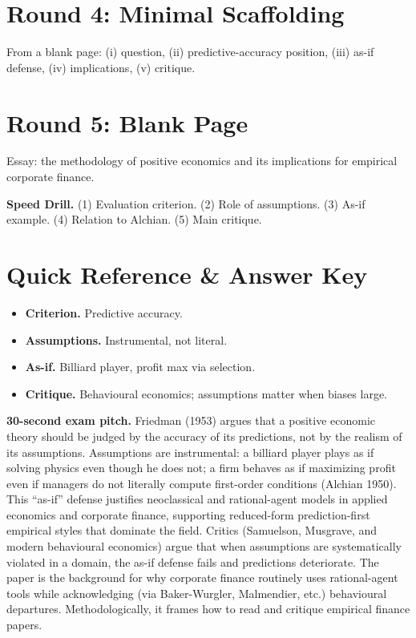 \documentclass[11pt]{article}
\begin{document}
\section*{Round 4: Minimal Scaffolding}
From a blank page: (i) question, (ii) predictive-accuracy position, (iii) as-if defense, (iv) implications, (v) critique.

\section*{Round 5: Blank Page}
Essay: the methodology of positive economics and its implications for empirical corporate finance.

\vspace{6pt}
\begin{drillbox}
\textbf{Speed Drill.} (1) Evaluation criterion. (2) Role of assumptions. (3) As-if example. (4) Relation to Alchian. (5) Main critique.
\end{drillbox}

\section*{Quick Reference \& Answer Key}
\begin{answerbox}
\begin{itemize}
\item \textbf{Criterion.} Predictive accuracy.
\item \textbf{Assumptions.} Instrumental, not literal.
\item \textbf{As-if.} Billiard player, profit max via selection.
\item \textbf{Critique.} Behavioural economics; assumptions matter when biases large.
\end{itemize}
\end{answerbox}

\begin{keybox}
\textbf{30-second exam pitch.} Friedman (1953) argues that a positive economic theory should be judged by the accuracy of its predictions, not by the realism of its assumptions. Assumptions are instrumental: a billiard player plays as if solving physics even though he does not; a firm behaves as if maximizing profit even if managers do not literally compute first-order conditions (Alchian 1950). This ``as-if'' defense justifies neoclassical and rational-agent models in applied economics and corporate finance, supporting reduced-form prediction-first empirical styles that dominate the field. Critics (Samuelson, Musgrave, and modern behavioural economics) argue that when assumptions are systematically violated in a domain, the as-if defense fails and predictions deteriorate. The paper is the background for why corporate finance routinely uses rational-agent tools while acknowledging (via Baker-Wurgler, Malmendier, etc.) behavioural departures. Methodologically, it frames how to read and critique empirical finance papers.
\end{keybox}
\end{document}
